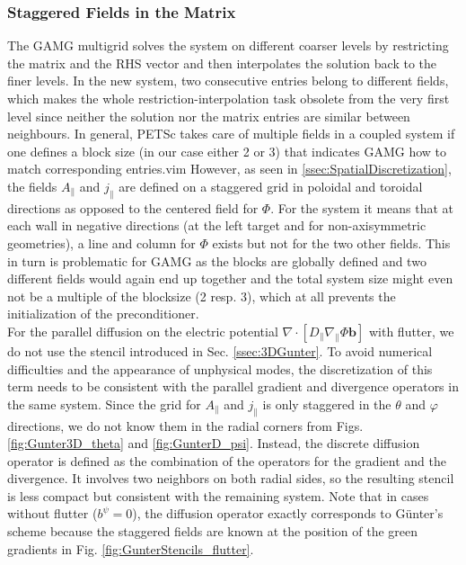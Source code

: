\subsubsection{Staggered Fields in the Matrix}
\label{ssec:StaggeredFieldsMatrix}
The GAMG multigrid solves the system on different coarser levels by restricting the matrix and the RHS vector and then interpolates the solution back to the finer levels. In the new system, two consecutive entries belong to different fields, which makes the whole restriction-interpolation task obsolete from the very first level since neither the solution nor the matrix entries are similar between neighbours. In general, PETSc takes care of multiple fields in a coupled system if one defines a block size (in our case either 2 or 3) that indicates GAMG how to match corresponding entries.vim  However, as seen in \autoref{ssec:SpatialDiscretization}, the fields $A_\parallel$ and $j_\parallel$ are defined on a staggered grid in poloidal and toroidal directions as opposed to the centered field for $\Phi$. For the system it means that at each wall in negative directions (at the left target and for non-axisymmetric geometries), a line and column for $\Phi$ exists but not for the two other fields. This in turn is problematic for GAMG as the blocks are globally defined and two different fields would again end up together and the total system size might even not be a multiple of the blocksize (2 resp. 3), which at all prevents the initialization of the preconditioner. \\


For the parallel diffusion on the electric potential $\nabla \cdot \left[ D_\parallel \nabla_\parallel \Phi \mathbf{b} \right]$ with flutter, we do not use the stencil introduced in Sec. \ref{ssec:3DGunter}. To avoid numerical difficulties and the appearance of unphysical modes, the discretization of this term needs to be consistent with the parallel gradient and divergence operators in the same system. Since the grid for $A_\parallel$ and $j_\parallel$ is only staggered in the $\theta$ and $\varphi$ directions, we do not know them in the radial corners from Figs. \ref{fig:Gunter3D_theta} and \ref{fig:GunterD_psi}. Instead, the discrete diffusion operator is defined as the combination of the operators for the gradient and the divergence. It involves two neighbors on both radial sides, so the resulting stencil is less compact but consistent with the remaining system. Note that in cases without flutter ($b^\psi = 0$), the diffusion operator exactly corresponds to Günter's scheme \cite{gunter2005} because the staggered fields are known at the position of the green gradients in Fig. \ref{fig:GunterStencils_flutter}. \newline



